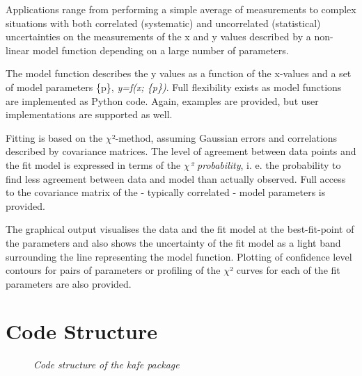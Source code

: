 \documentclass[a4paper,10pt,english]{sphinxmanual}
\begin{document}
Applications range from performing a simple average of measurements
to complex situations with both correlated (systematic) and
uncorrelated (statistical) uncertainties on the measurements
of the x and y values described by a non-linear model function
depending on a large number of parameters.

The model function describes the y values as a function of the
x-values and a set of model parameters \{p\}, \emph{y=f(x; \{p\})}. Full
flexibility exists as model functions are implemented as
Python code. Again, examples are provided, but user
implementations are supported as well.

Fitting is based on the \(\chi\)²-method, assuming Gaussian errors and
correlations described by covariance matrices. The level of agreement
between data points and the fit model is expressed in terms of the
\emph{\(\chi\)² probability}, i. e. the probability to find less agreement between
data and model than actually observed. Full access to the covariance
matrix of the - typically correlated - model parameters is provided.

The graphical output visualises the data and the fit model at the
best-fit-point of the parameters and also shows the uncertainty
of the fit model as a light band surrounding the line representing
the model function. Plotting of confidence level contours for pairs
of parameters or profiling of the \(\chi\)² curves for each of the fit
parameters are also provided.


\section{Code Structure}
\label{overview:code-structure}\begin{figure}[htbp]\begin{flushright}
\capstart

\caption{\emph{Code structure of the kafe package}}\end{flushright}\end{figure}
\end{document}
